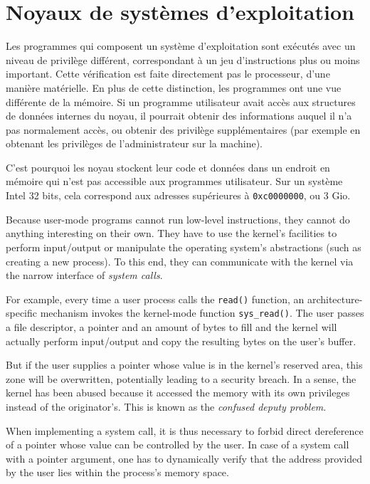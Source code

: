 \section{Noyaux de systèmes d'exploitation}

Les programmes qui composent un système d'exploitation sont exécutés avec un
niveau de privilège différent, correspondant à un jeu d'instructions plus ou
moins important. Cette vérification est faite directement pas le processeur,
d'une manière matérielle. En plus de cette distinction, les programmes ont une
vue différente de la mémoire. Si un programme utilisateur avait accès aux
structures de données internes du noyau, il pourrait obtenir des informations
auquel il n'a pas normalement accès, ou obtenir des privilège supplémentaires
(par exemple en obtenant les privilèges de l'administrateur sur la machine).

C'est pourquoi les noyau stockent leur code et données dans un endroit en
mémoire qui n'est pas accessible aux programmes utilisateur. Sur un système
Intel 32 bits, cela correspond aux adresses supérieures à \texttt{0xc0000000},
ou 3 Gio.


Because user-mode programs cannot run low-level instructions, they cannot do
anything interesting on their own. They have to use the kernel's facilities to
perform input/output or manipulate the operating system's abstractions (such as
creating a new process). To this end, they can communicate with the kernel
via the narrow interface of \emph{system calls}.

For example, every time a user process calls the \texttt{read()} function, an
architecture-specific mechanism invokes the kernel-mode function
\texttt{sys\_read()}. The user passes a file descriptor, a pointer and an amount
of bytes to fill and the kernel will actually perform input/output and copy the
resulting bytes on the user's buffer.

But if the user supplies a pointer whose value is in the kernel's reserved area,
this zone will be overwritten, potentially leading to a security breach. In a
sense, the kernel has been abused because it accessed the memory with its own
privileges instead of the originator's. This is known as the \emph{confused
deputy problem}\cite{hardy88confused}.

When implementing a system call, it is thus necessary to forbid direct
dereference of a pointer whose value can be controlled by the user. In case of a
system call with a pointer argument, one has to dynamically verify that the
address provided by the user lies within the process's memory space.

